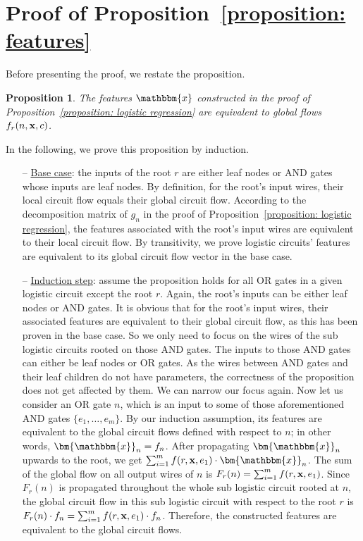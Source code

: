 \documentclass[letterpaper]{article} %
\newtheorem*{proposition*}{Proposition}
\newcommand{\sample}{{\bf x}}
\begin{document}
 \section{Proof of Proposition~\ref{proposition: features}}
\label{section: proof of proposition}
 Before presenting the proof, we restate the proposition.
 \begin{proposition*}
The features $\mathbbm{x}$ constructed in the proof of Proposition~\ref{proposition: logistic regression} are equivalent to global flows $f_r(n,\sample,c)$.
 \end{proposition*}
In the following, we prove this proposition by induction.
 \begin{itemize}
\item[--] \underline{Base case}: the inputs of the root $r$ are either leaf nodes or AND gates whose inputs are leaf nodes. By definition, for the root's input wires, their local circuit flow equals their global circuit flow. According to the decomposition matrix of $g_n$ in the proof of Proposition~\ref{proposition: logistic regression}, the features associated with the root's input wires are equivalent to their local circuit flow. By transitivity, we prove logistic circuits' features are equivalent to its global circuit flow vector in the base case.
\item[--] \underline{Induction step}: assume the proposition holds for all OR gates in a given logistic circuit except the root $r$. Again, the root's inputs can be either leaf nodes or AND gates. It is obvious that for the root's input wires, their associated features are equivalent to their global circuit flow, as this has been proven in the base case.
So we only need to focus on the wires of the sub logistic circuits rooted on those AND gates. The inputs to those AND gates can either be leaf nodes or OR gates. As the wires between AND gates and their leaf children do not have parameters, the correctness of the proposition does not get affected by them. We can narrow our focus again. Now let us consider an OR gate $n$, which is an input to some of those aforementioned AND gates $\{e_1,\dots, e_m\}$. By our induction assumption, its features are equivalent to the global circuit flows defined with respect to $n$; in other words, $\bm{\mathbbm{x}}_n = f_n$. After propagating $\bm{\mathbbm{x}}_n$ upwards to the root, we get $\sum_{i=1}^m f(r, {\bf x}, e_1)\cdot \bm{\mathbbm{x}}_n$. The sum of the global flow on all output wires of $n$ is $F_r(n) = \sum_{i=1}^m f(r, {\bf x}, e_1) $. Since $F_r(n)$ is propagated throughout the whole sub logistic circuit rooted at $n$, the global circuit flow in this sub logistic circuit with respect to the root $r$ is $F_r(n)\cdot f_n =  \sum_{i=1}^m f(r, {\bf x}, e_1) \cdot f_n$. Therefore, the constructed features are equivalent to the global circuit flows.
\end{itemize}
\end{document}
